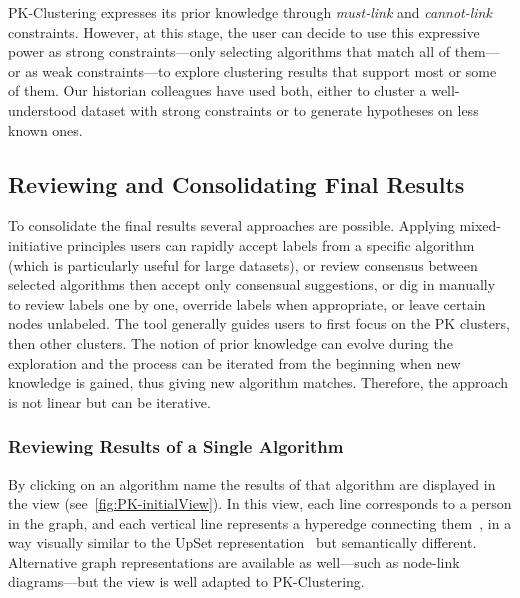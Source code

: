 PK-Clustering expresses its prior knowledge through \emph{must-link} and \emph{cannot-link} constraints. However, at this stage, the user can decide to use this expressive power as strong constraints---only selecting algorithms that match all of them---or as weak constraints---to explore clustering results that support most or some of them. Our historian colleagues have used both, either to cluster a well-understood dataset with strong constraints or to generate hypotheses on less known ones.



\subsection{Reviewing and Consolidating Final Results}
To consolidate the final results several approaches are possible. Applying mixed-initiative principles users can rapidly accept labels from a specific algorithm (which is particularly useful for large datasets), or review consensus between selected algorithms then accept only consensual suggestions, or dig in manually to review labels one by one, override labels when appropriate, or leave certain nodes unlabeled.  The tool generally  guides users to first focus on the PK clusters, then other clusters.
The notion of prior knowledge can evolve during the exploration and the process can be iterated from the beginning when new knowledge is gained, thus giving new algorithm matches. Therefore, the approach is not linear but can be iterative.

\subsubsection{Reviewing Results of a Single Algorithm}
By clicking on an algorithm name the results of that algorithm are displayed in the \paovis view (see~\autoref{fig:PK-initialView}). In this view, each line corresponds to a person in the graph, and each vertical line represents a hyperedge connecting them~\cite{valdiviaAnalyzingDynamicHypergraphs2021}, in a way visually similar to the UpSet representation~\cite{lexUpSetVisualizationIntersecting2014} but semantically different.  Alternative graph representations are available as well---such as node-link diagrams---but the \paovis view is well adapted to PK-Clustering.


